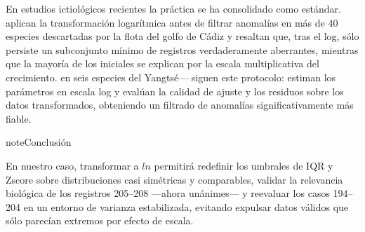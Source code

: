 \documentclass[a4paper,10pt,spanish]{jupyterBook}
\begin{document}
\sphinxAtStartPar
En estudios ictiológicos recientes la práctica se ha consolidado como estándar.  aplican la transformación logarítmica antes de filtrar anomalías en más de 40 especies descartadas por la flota del golfo de Cádiz y resaltan que, tras el log, sólo persiste un subconjunto mínimo de registros verdaderamente aberrantes, mientras que la mayoría de los  iniciales se explican por la escala multiplicativa del crecimiento.  en seis especies del Yangtsé— siguen este protocolo: estiman los parámetros en escala log y evalúan la calidad de ajuste y los residuos sobre los datos transformados, obteniendo un filtrado de anomalías significativamente más fiable.

\begin{sphinxadmonition}{note}{Conclusión}

\sphinxAtStartPar
En nuestro caso, transformar a \(ln\) permitirá redefinir los umbrales de IQR y Z\sphinxhyphen{}score sobre distribuciones casi simétricas y comparables, validar la relevancia biológica de los registros 205–208 —ahora  unánimes— y re\sphinxhyphen{}evaluar los casos 194–204 en un entorno de varianza estabilizada, evitando expulsar datos válidos que sólo parecían extremos por efecto de escala.
\end{sphinxadmonition}
\end{document}
